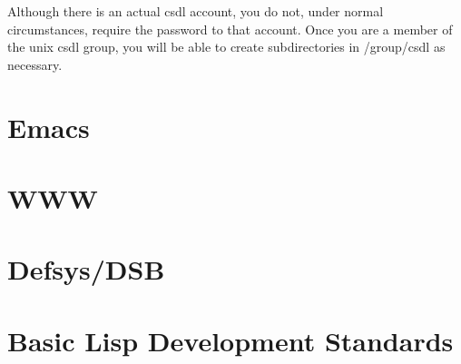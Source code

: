 Although there is an actual csdl account, you do not, under normal
circumstances, require the password to that account. Once you are 
a member of the unix csdl group, you will be able to create
subdirectories in /group/csdl as necessary.

\section{Emacs}


\section{WWW}


\section{Defsys/DSB}

\section{Basic Lisp Development Standards}












